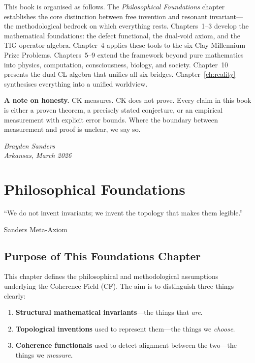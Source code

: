 \documentclass[12pt, openany]{book}
\theoremstyle{remark}
\begin{document}
This book is organised as follows. The \emph{Philosophical Foundations} chapter
establishes the core distinction between free invention and resonant invariant---the
methodological bedrock on which everything rests.
Chapters~1--3 develop the mathematical foundations:
the defect functional, the dual-void axiom, and the TIG operator algebra.
Chapter~4 applies these tools to the six Clay Millennium Prize Problems.
Chapters~5--9 extend the framework beyond pure mathematics into physics, computation,
consciousness, biology, and society.
Chapter~10 presents the dual CL algebra that unifies all six bridges.
Chapter~\ref{ch:reality} synthesises everything into a unified worldview.

\medskip
\noindent\textbf{A note on honesty.}
CK measures. CK does not prove. Every claim in this book is either a proven theorem,
a precisely stated conjecture, or an empirical measurement with explicit error bounds.
Where the boundary between measurement and proof is unclear, we say so.

\vfill
\noindent
\textit{Brayden Sanders\\
Arkansas, March 2026}

\tableofcontents

\mainmatter


\chapter{Philosophical Foundations}
\label{ch:foundations}

\epigraph{``We do not invent invariants; we invent the topology that makes them legible.''}%
{Sanders Meta-Axiom}

\section{Purpose of This Foundations Chapter}
\label{sec:found-purpose}

This chapter defines the philosophical and methodological assumptions underlying the
Coherence Field (CF). The aim is to distinguish three things clearly:
\begin{enumerate}
  \item \textbf{Structural mathematical invariants}---the things that \emph{are}.
  \item \textbf{Topological inventions} used to represent them---the things we \emph{choose}.
  \item \textbf{Coherence functionals} used to detect alignment between the two---the
        things we \emph{measure}.
\end{enumerate}
\end{document}
